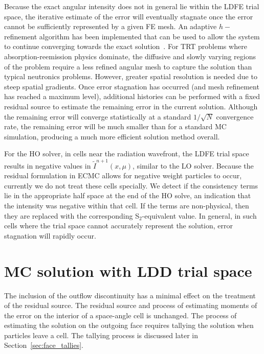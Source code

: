 Because the exact angular intensity does not in general lie within the LDFE trial space, the
iterative estimate of the error will eventually stagnate once the error cannot be sufficiently
represented by a given FE mesh.  An adaptive $h-$refinement algorithm has been
implemented that can be used to allow the system to continue converging towards the
exact solution~\cite{jake,ans_2014}. For TRT problems where absorption-reemission physics dominate, the diffusive and slowly varying
regions of the problem require a less refined angular mesh to capture the solution than typical neutronics
problems.  However, greater spatial resolution is needed due to steep spatial
gradients.   
Once error stagnation has occurred (and mesh refinement has reached a maximum level),
additional histories can be performed with a
fixed residual source to estimate the remaining error in the current solution.  Although the remaining error will
converge statistically at a standard $1/\sqrt{N}$ convergence rate, the remaining
error will be much smaller than for a standard MC simulation, producing a much more
efficient solution method overall.

For the HO solver, in cells near the radiation wavefront, the LDFE trial space results in
negative values in $\tilde{I}^{n+1}(x,\mu)$, similar to the LO solver.  Because the residual formulation in ECMC allows for negative weight
particles to occur, currently we do not treat these cells specially.  We detect if
the consistency terms lie in the appropriate half space at the end of the HO solve,
an indication that the intensity was negative within that cell.  If the terms are non-physical, then
they are replaced with the corresponding S$_2$-equivalent value. In general,
in such cells where the trial space cannot accurately represent the solution, error stagnation will
rapidly occur. 

\section{MC solution with LDD trial space}
\label{sec:ldd_mc}

The inclusion of the outflow discontinuity has a minimal effect on the treatment of the
residual source. The residual source and process of estimating moments of
the error on the interior of a space-angle cell is unchanged.  The process of estimating
the solution on the outgoing face requires tallying the solution when particles leave a
cell. The tallying process is discussed later in Section~\ref{sec:face_tallies}.  

